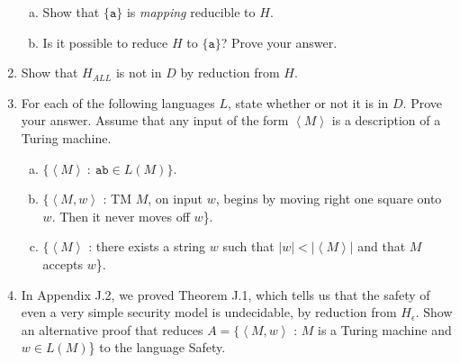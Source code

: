 \documentclass[10pt]{article}
\newcommand{\card}[1]{\left| #1 \right|}
\newcommand{\brackets}[1]{\left< #1 \right>}
\begin{document}
\begin{enumerate}[1)]
\begin{enumerate}[a)]
\item
Show that $\{\texttt{a}\}$ is \emph{mapping} reducible to $H$.  

\item
Is it possible to reduce $H$ to $\{\texttt{a}\}$?  Prove your answer.
\end{enumerate}


\item
Show that $H_{ALL}$ is not in $D$ by reduction from $H$.



\item
For each of the following languages $L$, state whether or not it is in $D$.  Prove your answer.  Assume that any input of the form $\brackets{M}$ is a description of a Turing machine.
\begin{enumerate}[a)]

\item
$\{\brackets{M}\ :\ \texttt{ab} \in L(M)\}$.

\item
$\{\brackets{M, w}$ : TM $M$, on input $w$, begins by moving right one square onto $w$.  Then it never moves off $w$\}.

\item
$\{\brackets{M}$ : there exists a string $w$ such that $\card{w} < \card{\brackets{M}}$ and that $M$ accepts $w$\}.
\end{enumerate}


\item
In Appendix J.2, we proved Theorem J.1, which tells us that the safety of even a very simple security model is undecidable, by reduction from $H_\epsilon$.  Show an alternative proof that reduces $A = \{\brackets{M, w}$ :  $M$ is a Turing machine and $w \in L(M)$\} to the language Safety.
\end{enumerate}
\end{document}
